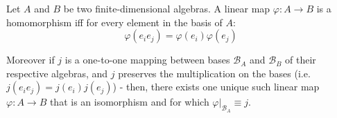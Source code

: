 \begin{theorem}
    Let $A$ and $B$ be two finite-dimensional algebras.
	A linear map $\varphi: A \to B$ is a homomorphism iff for every element in the basis of $A$:
	\[\varphi(e_ie_j) = \varphi(e_i)\varphi(e_j)\]

	Moreover if $j$ is a one-to-one mapping between bases $\mathcal{B}_A$ and $\mathcal{B}_B$ of their respective algebras, and $j$ preserves the multiplication on the bases (i.e. $j(e_ie_j) = j(e_i)j(e_j)$) - then, there exists one unique such linear map $\varphi: A \to B$ that is an isomorphism and for which $\varphi|_{\mathcal{B}_A} \equiv j$.
\end{theorem}
